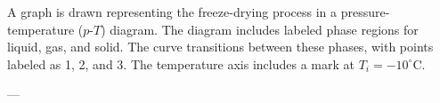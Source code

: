 A graph is drawn representing the freeze-drying process in a pressure-temperature (\(p\)-\(T\)) diagram. The diagram includes labeled phase regions for liquid, gas, and solid. The curve transitions between these phases, with points labeled as 1, 2, and 3. The temperature axis includes a mark at \(T_i = -10^\circ\text{C}\).

---